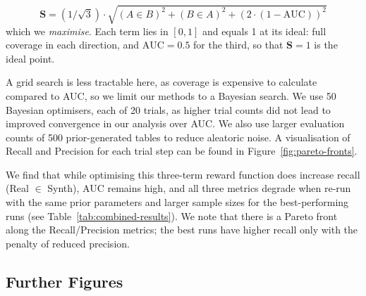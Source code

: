 \documentclass{article}
\begin{document}
\begin{equation}
\label{eqn:triple-loss}
    \mathbf{S} = \left(1/\sqrt{3}\right) \cdot \sqrt{\left(A\in B\right)^2 + \left(B \in A\right)^2 + \left(2 \cdot (1 - \textrm{AUC})\right)^2}
\end{equation}
which we \emph{maximise}. Each term lies in $[0, 1]$ and equals 1 at its ideal: full coverage in each direction, and $\textrm{AUC} = 0.5$ for the third, so that $\mathbf{S} = 1$ is the ideal point.



A grid search is less tractable here, as coverage is expensive to calculate compared to AUC, so we limit our methods to a Bayesian search.
We use 50 Bayesian optimisers, each of 20 trials, as higher trial counts did not lead to improved convergence in our analysis over AUC.
We also use larger evaluation counts of 500 prior-generated tables to reduce aleatoric noise.
A visualisation of Recall and Precision for each trial step can be found in Figure~\ref{fig:pareto-fronts}.



We find that while optimising this three-term reward function does increase recall (Real $\in$ Synth), AUC remains high, and all three metrics degrade when re-run with the same prior parameters and larger sample sizes for the best-performing runs (see Table~\ref{tab:combined-results}).
We note that there is a Pareto front along the Recall/Precision metrics; the best runs have higher recall only with the penalty of reduced precision.



\subsection{Further Figures}
\end{document}
